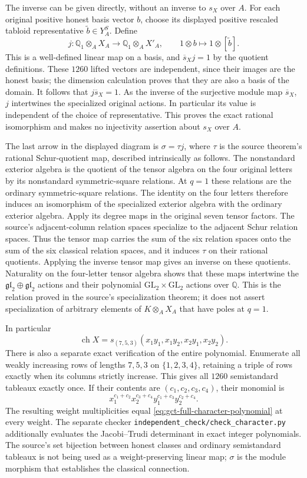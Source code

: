 The inverse can be given directly, without an inverse to $s_X$
over $A$. For each original positive honest basis vector $b$,
choose its displayed positive rescaled tabloid representative
$\widetilde b\in Y_A^S$. Define
\[
 j:\mathbb Q_1\otimes_A X_A\longrightarrow
 \mathbb Q_1\otimes_A X'_A,\qquad
 1\otimes b\longmapsto1\otimes[\widetilde b].
\]
This is a well-defined linear map on a basis, and
$\overline s_X j=1$ by the quotient definitions. These $1260$
lifted vectors are independent, since their images are the
honest basis; the dimension calculation proves that they are
also a basis of the domain. It follows that
$j\overline s_X=1$. As the inverse of the surjective module
map $\overline s_X$, $j$ intertwines the specialized original
actions. In particular its value is independent of the choice
of representative. This proves the exact rational isomorphism
and makes no injectivity assertion about $s_X$ over $A$.

The last arrow in the displayed diagram is $\sigma=\tau j$,
where $\tau$ is the source theorem's rational Schur-quotient
map, described intrinsically as follows. The nonstandard exterior
algebra is the quotient of the tensor algebra on the four original
letters by its nonstandard symmetric-square relations. At $q=1$
these relations are the ordinary symmetric-square relations. The
identity on the four letters therefore induces an isomorphism of
the specialized exterior algebra with the ordinary exterior algebra.
Apply its degree maps in the original seven tensor factors. The
source's adjacent-column relation spaces specialize to the adjacent
Schur relation spaces. Thus the tensor map carries the sum of the
six relation spaces onto the sum of the six classical relation
spaces, and it induces $\tau$ on their rational quotients. Applying the
inverse tensor map gives an inverse on these quotients. Naturality
on the four-letter tensor algebra shows that these maps intertwine
the $\mathfrak{gl}_2\oplus\mathfrak{gl}_2$ actions and their
polynomial $\mathrm{GL}_2\times\mathrm{GL}_2$ actions over
$\mathbb Q$. This is the relation proved in the source's
specialization theorem; it does not assert specialization of arbitrary
elements of $K\otimes_A X_A$ that have poles at $q=1$.

In particular
\[
 \operatorname{ch}X=s_{(7,5,3)}
 (x_1y_1,x_1y_2,x_2y_1,x_2y_2).
\]
There is also a separate exact verification of the entire polynomial.
Enumerate all weakly increasing rows of lengths $7,5,3$ on
$\{1,2,3,4\}$, retaining a triple of rows exactly when its columns
strictly increase. This gives all $1260$ semistandard tableaux
exactly once. If their contents are $(c_1,c_2,c_3,c_4)$, their
monomial is
\[
 x_1^{c_1+c_2}x_2^{c_3+c_4}
 y_1^{c_1+c_3}y_2^{c_2+c_4}.
\]
The resulting weight multiplicities equal
\eqref{eq:gct-full-character-polynomial} at every weight.
The separate checker
\texttt{independent\_check/check\_character.py} additionally evaluates the Jacobi--Trudi
determinant in exact integer polynomials. The source's set bijection
between honest classes and ordinary semistandard tableaux is not
being used as a weight-preserving linear map; $\sigma$ is the
module morphism that establishes the classical connection.

